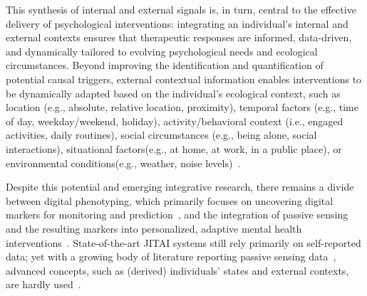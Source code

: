 This synthesis of internal and external signals is, in turn, central to the effective delivery of psychological interventions: integrating an individual's internal and external contexts ensures that therapeutic responses are informed, data-driven, and dynamically tailored to evolving psychological needs and ecological circumstances. Beyond improving the identification and quantification of potential causal triggers, external contextual information enables interventions to be dynamically adapted based on the individual's ecological context, such as location (e.g., absolute, relative location, proximity), temporal factors (e.g., time of day, weekday/weekend, holiday), activity/behavioral context (i.e., engaged activities, daily routines), social circumstances (e.g., being alone, social interactions), situational factors(e.g., at home, at work, in a public place), or environmental conditions(e.g., weather, noise levels)~\cite{nahumshani2018jitai, balaskas2021ecological}. 

Despite this potential and emerging integrative research, there remains a divide between digital phenotyping, which primarily focuses on uncovering digital markers for monitoring and prediction~\cite{choi2024digital}, and the integration of passive sensing and the resulting markers into personalized, adaptive mental health interventions~\cite{bosch2025integration, choi2024digital}. State-of-the-art JITAI systems still rely primarily on self-reported data; yet with a growing body of literature reporting passive sensing data~\cite{hsu2025personalized, somkuwar2026transforming}, advanced concepts, such as (derived) individuals’ states and external contexts, are hardly used~\cite{van2025beyond}. 




